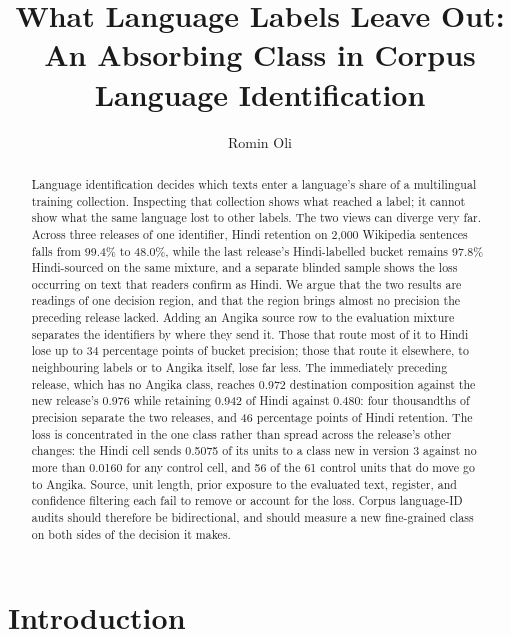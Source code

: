 \documentclass[final]{clv2025}
\begin{document}
\title{What Language Labels Leave Out:\\An Absorbing Class in Corpus Language Identification}
\author{Romin Oli}
\maketitle
\pagestyle{pageonly}\thispagestyle{pageonly}
\begin{abstract}
Language identification decides which texts enter a language's share of a multilingual training collection. Inspecting that collection shows what reached a label; it cannot show what the same language lost to other labels. The two views can diverge very far. Across three releases of one identifier, Hindi retention on 2,000 Wikipedia sentences falls from 99.4\% to 48.0\%, while the last release's Hindi-labelled bucket remains 97.8\% Hindi-sourced on the same mixture, and a separate blinded sample shows the loss occurring on text that readers confirm as Hindi. We argue that the two results are readings of one decision region, and that the region brings almost no precision the preceding release lacked. Adding an Angika source row to the evaluation mixture separates the identifiers by where they send it. Those that route most of it to Hindi lose up to 34 percentage points of bucket precision; those that route it elsewhere, to neighbouring labels or to Angika itself, lose far less. The immediately preceding release, which has no Angika class, reaches 0.972 destination composition against the new release's 0.976 while retaining 0.942 of Hindi against 0.480: four thousandths of precision separate the two releases, and 46 percentage points of Hindi retention. The loss is concentrated in the one class rather than spread across the release's other changes: the Hindi cell sends 0.5075 of its units to a class new in version 3 against no more than 0.0160 for any control cell, and 56 of the 61 control units that do move go to Angika. Source, unit length, prior exposure to the evaluated text, register, and confidence filtering each fail to remove or account for the loss. Corpus language-ID audits should therefore be bidirectional, and should measure a new fine-grained class on both sides of the decision it makes.

\end{abstract}

\section{Introduction}
\end{document}
